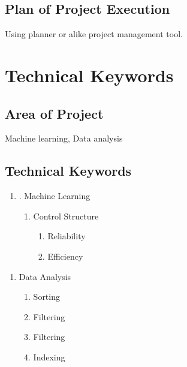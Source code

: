 \documentclass[oneside,a4paper,12pt]{book}
\begin{document}
\begin{enumerate}
\begin{itemize}
   \end{itemize}

\section{Plan of Project Execution}
  Using planner or alike project management tool.



\chapter{Technical Keywords}
\section{Area of Project}
Machine learning, Data analysis 

\section{Technical Keywords}
\begin{enumerate}
	\item .  Machine Learning 
	\begin{enumerate}
		\item Control Structure  
		\begin{enumerate}
			    \item  Reliability  
				\item  Efficiency 
	    \end{enumerate} 
	 		
    \end{enumerate} 
    
\end{enumerate}
	
\begin{enumerate}
	\item Data Analysis 
	\begin{enumerate}
		\item   	Sorting
		\item		Filtering
		\item		Filtering
		\item		Indexing
	 		

\end{enumerate}
\end{enumerate}
\end{enumerate}
\end{document}
